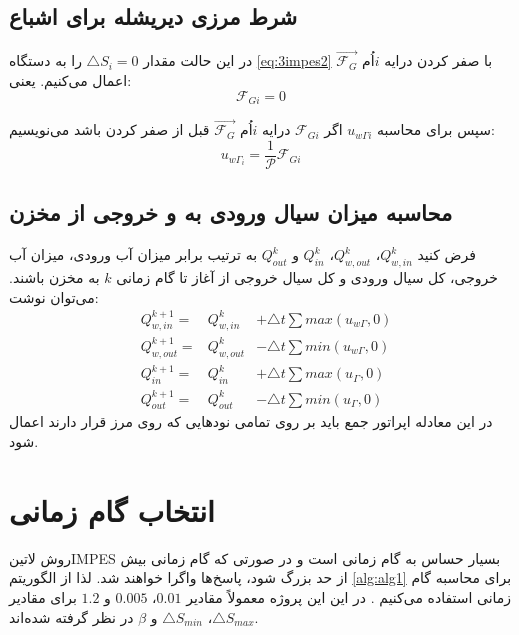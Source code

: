 \subsection*{شرط مرزی دیریشله برای اشباع}
در این حالت مقدار $\triangle S_i = 0$ را به دستگاه \eqref{eq:3impes2} با صفر کردن درایه $i$اُم $\vec {\mathcal F_{G}}$  اعمال می‌کنیم. یعنی:
\begin{equation}
\label{eq:3bnd8}
\mathcal F_{Gi} = 0
\end{equation} 

سپس برای محاسبه $u_{w\Gamma i}$ اگر $\mathcal F_{Gi} $ درایه $i$اُم $\vec {\mathcal F_{G}}$ قبل از صفر کردن باشد می‌نویسیم:
\begin{equation}
\label{eq:3bnd9}
u_{w\Gamma_i}= \frac{1}{\mathcal P} \mathcal F_{Gi} 
\end{equation}
\subsection*{محاسبه میزان سیال ورودی به و خروجی از مخزن}
فرض کنید 
$Q^k_{w,in}$، $Q^k_{w,out}$، $Q^k_{in}$  و $Q^k_{out}$
به ترتیب برابر میزان آب ورودی، میزان آب خروجی، کل سیال ورودی و کل سیال خروجی از آغاز تا گام زمانی $k$ به مخزن باشند. می‌توان نوشت:
\begin{equation}
\begin{aligned}
\label{eq:3bnd10}
&Q^{k+1}_{w,in} = &Q^k_{w,in} &+ \triangle t\sum max(u_{w\Gamma} , 0) \\
&Q^{k+1}_{w,out} = &Q^k_{w,out} &-\triangle t\sum min(u_{w\Gamma} , 0) \\
&Q^{k+1}_{in} = &Q^k_{in} &+\triangle t\sum max(u_{\Gamma} , 0) \\
&Q^{k+1}_{out} = &Q^k_{out} &-\triangle t\sum min(u_{\Gamma} , 0)
\end{aligned}
\end{equation}
در این معادله اپراتور جمع باید بر روی تمامی نود‌هایی که روی مرز قرار دارند اعمال شود.

\section{انتخاب گام زمانی}
روش \text‌لاتین{IMPES} بسیار حساس به گام زمانی است و در صورتی که گام زمانی بیش از حد بزرگ شود، پاسخ‌ها واگرا خواهند شد. لذا از الگوریتم \ref{alg:alg1} برای محاسبه گام زمانی استفاده می‌کنیم \cite{mont1}. در این این پروژه معمولاً مقادیر $0.01$، $0.005$ و $1.2$ برای مقادیر
 $\triangle S_{max}$،   $\triangle S_{min}$ و $\beta$
در نظر گرفته شده‌اند.

